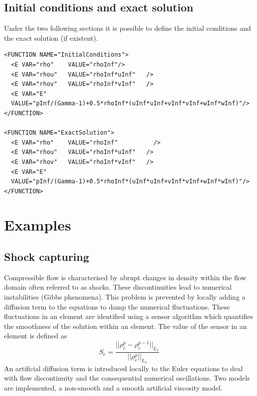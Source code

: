 \subsection*{Initial conditions and exact solution}
Under the two following sections it is possible to define the initial conditions and the exact solution (if existent).
\begin{lstlisting}[style=XmlStyle]           
<FUNCTION NAME="InitialConditions">
  <E VAR="rho"    VALUE="rhoInf"/>
  <E VAR="rhou"   VALUE="rhoInf*uInf"   />
  <E VAR="rhov"   VALUE="rhoInf*vInf"   />
  <E VAR="E"      
  VALUE="pInf/(Gamma-1)+0.5*rhoInf*(uInf*uInf+vInf*vInf+wInf*wInf)"/>
</FUNCTION>
                
<FUNCTION NAME="ExactSolution">
  <E VAR="rho"    VALUE="rhoInf"          />
  <E VAR="rhou"   VALUE="rhoInf*uInf"   />
  <E VAR="rhov"   VALUE="rhoInf*vInf"   />
  <E VAR="E"      
  VALUE="pInf/(Gamma-1)+0.5*rhoInf*(uInf*uInf+vInf*vInf+wInf*wInf)"/>
</FUNCTION>
\end{lstlisting}

\section{Examples}
\subsection{Shock capturing}
Compressible flow is characterised by abrupt changes in density within the flow domain often referred to as shocks. These discontinuities lead to numerical instabilities (Gibbs phenomena). This problem is prevented by locally adding a diffusion term to the equations to damp the numerical fluctuations. These fluctuations in an element are identified using a sensor algorithm which quantifies the smoothness of the solution within an element. The value of the sensor in an element is defined as
\begin{equation}\label{eq:sensor}
S_e=\frac{||\rho^p_e-\rho^{p-1}_e||_{L_2}}{||\rho_e^p||_{L_2}}
\end{equation}
An artificial diffusion term is introduced locally to the Euler equations to deal with flow discontinuity and the consequential numerical oscillations. Two models are implemented, a non-smooth and a smooth artificial viscosity model. 
